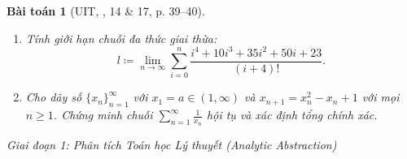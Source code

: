 \documentclass{article}
\newtheorem{baitoan}{Bài toán}
\begin{document}
\begin{baitoan}[UIT, \cite{VMS_VMC2025}, 14 \& 17, p. 39--40]
\begin{enumerate}
    \item[(a)] Tính giới hạn chuỗi đa thức giai thừa:
    \begin{equation}
        l \coloneqq \lim_{n\to\infty} \sum_{i=0}^n \frac{i^4 + 10i^3 + 35i^2 + 50i + 23}{(i + 4)!}.
    \end{equation}
    \item[(b)] Cho dãy số $\{x_n\}_{n=1}^\infty$ với $x_1 = a \in (1, \infty)$ và $x_{n+1} = x_n^2 - x_n + 1$ với mọi $n \ge 1$. Chứng minh chuỗi $\sum_{n=1}^\infty \frac{1}{x_n}$ hội tụ và xác định tổng chính xác.
\end{enumerate}
\end{baitoan}

\vspace{0.5em}\noindent\emph{Giai đoạn 1: Phân tích Toán học Lý thuyết (Analytic Abstraction)}
\end{document}
